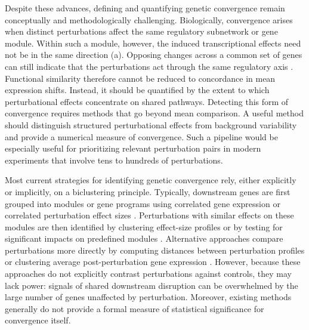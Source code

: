 \documentclass[11pt]{article}
\begin{document}
Despite these advances, defining and quantifying genetic convergence remain conceptually and methodologically challenging. Biologically, convergence arises when distinct perturbations affect the same regulatory subnetwork or gene module. Within such a module, however, the induced transcriptional effects need not be in the same direction (a). Opposing changes across a common set of genes can still indicate that the perturbations act through the same regulatory axis \citep{pensa2009stat1,dixit2016perturb,watanabe2019combinatorial}. Functional similarity therefore cannot be reduced to concordance in mean expression shifts. Instead, it should be quantified by the extent to which perturbational effects concentrate on shared pathways. Detecting this form of convergence requires methods that go beyond mean comparison. A useful method should distinguish structured perturbational effects from background variability and provide a numerical measure of convergence. Such a pipeline would be especially useful for prioritizing relevant perturbation pairs in modern experiments that involve tens to hundreds of perturbations.

Most current strategies for identifying genetic convergence rely, either explicitly or implicitly, on a biclustering principle. Typically, downstream genes are first grouped into modules or gene programs using correlated gene expression \citep{schnitzler2024convergence} or correlated perturbation effect sizes \citep{Regev:2023,zhou2023new}. Perturbations with similar effects on these modules are then identified by clustering effect-size profiles \citep{duan2019model,Regev:2023} or by testing for significant impacts on predefined modules \citep{schnitzler2024convergence,yang2025perturbdb}. Alternative approaches compare perturbations more directly by computing distances between perturbation profiles or clustering average post-perturbation gene expression \citep{peidli2024scperturb,celik2024building}. However, because these approaches do not explicitly contrast perturbations against controls, they may lack power: signals of shared downstream disruption can be overwhelmed by the large number of genes unaffected by perturbation. Moreover, existing methods generally do not provide a formal measure of statistical significance for convergence itself.
\end{document}
